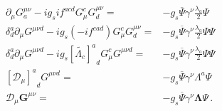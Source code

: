\begin{align}
\label{eq:Gmuael}
\partial_\mu{G}^{\mu\nu}_a-i g_s i f^{acd}G^c_\mu{G}^{\mu\nu}_d
=&-g_s\overline{\Psi}\gamma^\nu\frac{\lambda_a}{2}\Psi\nonumber\\
\delta^a_d\partial_\mu{G}^{\mu\nu d}-i g_s \left(-i f^{cad}\right)G^c_\mu{G}^{\mu\nu}_d
=&-g_s\overline{\Psi}\gamma^\nu\frac{\lambda_a}{2}\Psi\Psi\nonumber\\
\delta^a_d\partial_\mu{G}^{\mu\nu d}-i g_s {\left[\widetilde{\Lambda_c}\right]^a}_d G^c_\mu{G}^{\mu\nu d}
=&-g_s\overline{\Psi}\gamma^\nu\frac{\lambda_a}{2}\Psi\Psi\nonumber\\
{\left[ \mathcal{D}_\mu \right]^a}_d{G}^{\mu\nu d}
=&-g_s\overline{\Psi}\gamma^\nu\Lambda^{a}\Psi \nonumber\\
  \mathcal{D}_\mu{\boldsymbol{G}}^{\mu\nu}
=&-g_s\overline{\Psi}\gamma^\nu\boldsymbol{\Lambda}\Psi\,.
\end{align}
